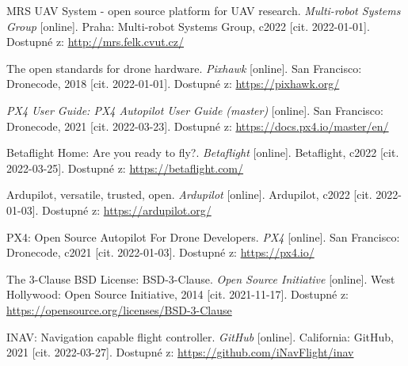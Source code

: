 

\begin{thebibliography}{99}

MRS UAV System - open source platform for UAV research. \textit{Multi-robot Systems Group} [online]. Praha: Multi-robot Systems Group, c2022 [cit. 2022-01-01]. Dostupné z: \href{http://mrs.felk.cvut.cz/}{http://mrs.felk.cvut.cz/}

The open standards for drone hardware. \textit{Pixhawk} [online]. San Francisco: Dronecode, 2018 [cit. 2022-01-01]. Dostupné z: \href{https://pixhawk.org/}{https://pixhawk.org/}

\textit{PX4 User Guide: PX4 Autopilot User Guide (master)} [online]. San Francisco: Dronecode, 2021 [cit. 2022-03-23]. Dostupné z: \href{https://docs.px4.io/master/en/}{https://docs.px4.io/master/en/}


Betaflight Home: Are you ready to fly?. \textit{Betaflight} [online]. Betaflight, c2022 [cit. 2022-03-25]. Dostupné z: \href{https://betaflight.com/}{https://betaflight.com/}


Ardupilot, versatile, trusted, open. \textit{Ardupilot} [online]. Ardupilot, c2022 [cit. 2022-01-03]. Dostupné z: \href{https://ardupilot.org/}{https://ardupilot.org/}

PX4: Open Source Autopilot For Drone Developers. \textit{PX4} [online]. San Francisco: Dronecode, c2021 [cit. 2022-01-03]. Dostupné z: \href{https://px4.io/}{https://px4.io/}

The 3-Clause BSD License: BSD-3-Clause. \textit{Open Source Initiative} [online]. West Hollywood: Open Source Initiative, 2014 [cit. 2021-11-17]. Dostupné z: \href{https://opensource.org/licenses/BSD-3-Clause}{https://opensource.org/licenses/BSD-3-Clause}

INAV: Navigation capable flight controller. \textit{GitHub} [online]. California: GitHub, 2021 [cit. 2022-03-27]. Dostupné z: \href{https://github.com/iNavFlight/inav}{https://github.com/iNavFlight/inav}


\end{thebibliography}
